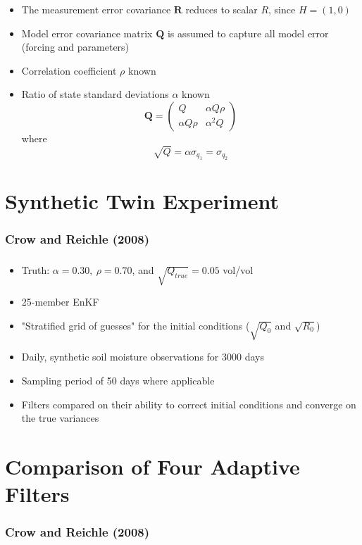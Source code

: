 \documentclass[mathserif]{beamer}
\begin{document}
\begin{frame}
  \frametitle{\insertsection}
  \begin{itemize}
    \item The measurement error covariance $\mathbf{R}$ reduces to scalar $R$, since $H = (1, 0)$
    \item Model error covariance matrix $\mathbf{Q}$ is assumed to capture all model error (forcing and parameters)
    \item Correlation coefficient $\rho$ known
    \item Ratio of state standard deviations $\alpha$ known
      \begin{equation}
        \mathbf{Q}=\begin{pmatrix}
          Q & \alpha Q \rho \\
          \alpha Q \rho & \alpha^2 Q
        \end{pmatrix}
      \end{equation}
      where
      \begin{equation}
        \sqrt{Q} = \alpha\sigma_{q_1} = \sigma_{q_2}
      \end{equation}
  \end{itemize}
\end{frame}

\section{Synthetic Twin Experiment}

\begin{frame}
  \frametitle{Crow and Reichle (2008)}
  \tableofcontents[currentsection]
\end{frame}

\begin{frame}
  \frametitle{\insertsection}
  \begin{itemize}
    \item Truth: $\alpha = 0.30,\ \rho= 0.70$, and $\sqrt{Q_{true}} = 0.05$ vol/vol
    \item 25-member EnKF
    \item "Stratified grid of guesses" for the initial conditions ($\sqrt{Q_0}$ and $\sqrt{R_0}$)
    \item Daily, synthetic soil moisture observations for 3000 days
    \item Sampling period of 50 days where applicable
    \item Filters compared on their ability to correct initial conditions and converge on the true variances
  \end{itemize}
\end{frame}

\section{Comparison of Four Adaptive Filters}

\begin{frame}
  \frametitle{Crow and Reichle (2008)}
  \tableofcontents[currentsection]
\end{frame}



\end{document}
